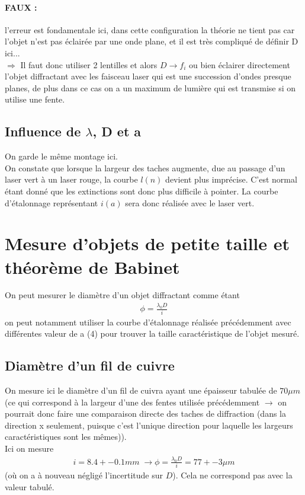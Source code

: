 \documentclass[12pt,prb,aps,epsf]{report}
\begin{document}
\paragraph{FAUX :} l'erreur est fondamentale ici, dans cette configuration la théorie ne tient pas car l'objet n'est pas éclairée par une onde plane, et il est très compliqué de définir D ici...\\
$\Rightarrow$ Il faut donc utiliser 2 lentilles et alors $D\rightarrow f_i$ ou bien éclairer directement l'objet diffractant avec les faisceau laser qui est une succession d'ondes presque planes, de plus dans ce cas on a un maximum de lumière qui est transmise si on utilise une fente.

\subsection{Influence de $\lambda$, D et a}
On garde le même montage ici.\\
On constate que lorsque la largeur des taches augmente, due au passage d'un laser vert à un laser rouge, la courbe $l(n)$ devient plus imprécise. C'est normal étant donné que les extinctions sont donc plus difficile à pointer. La courbe d'étalonnage représentant $i(a)$ sera donc réalisée avec le laser vert.

\section{Mesure d'objets de petite taille et théorème de Babinet}
On peut mesurer le diamètre d'un objet diffractant comme étant 
\begin{eqnarray}
\phi = \frac{\lambda_0 D}{i}
\end{eqnarray}
on peut notamment utiliser la courbe d'étalonnage réalisée précédemment avec différentes valeur de a (4) pour trouver la taille caractéristique de l'objet mesuré. 

\subsection{Diamètre d'un fil de cuivre}
On mesure ici le diamètre d'un fil de cuivra ayant une épaisseur tabulée de $70\mu m$ (ce qui correspond à la largeur d'une des fentes utilisée précédemment $\rightarrow$ on pourrait donc faire une comparaison directe des taches de diffraction (dans la direction x seulement, puisque c'est l'unique direction pour laquelle les largeurs caractéristiques sont les mêmes)). \\
Ici on mesure 
\begin{eqnarray}
i = 8.4 +- 0.1 mm\; \rightarrow \phi = \frac{\lambda_0 D}{i} = 77 +-3 \mu m
\end{eqnarray}
(où on a à nouveau négligé l'incertitude sur $D$). Cela ne correspond pas avec la valeur tabulé.
\end{document}
